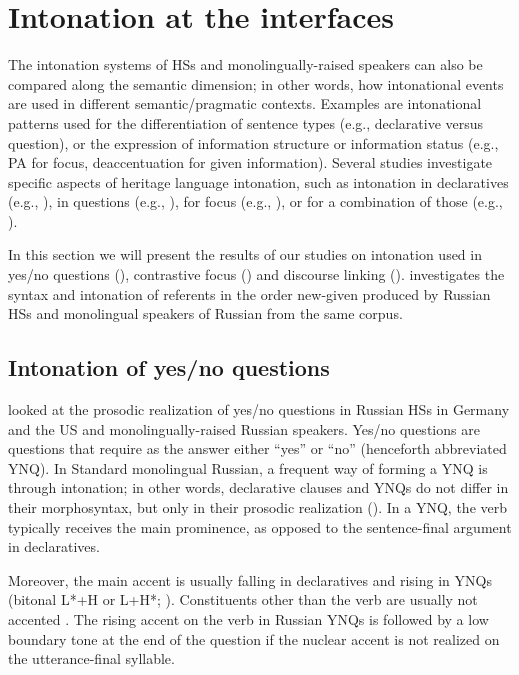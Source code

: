 \documentclass[output=paper,colorlinks,citecolor=brown]{langscibook}
\begin{document}
\section{Intonation at the interfaces} \label{chapter12:section 4}

The intonation systems of HSs and monolingually-raised speakers can also be compared along the semantic dimension; in other words, how intonational events are used in different semantic/pragmatic contexts. Examples are intonational patterns used for the differentiation of sentence types (e.g., declarative versus question), or the expression of information structure or information status (e.g., PA for focus, deaccentuation for given information). Several studies investigate specific aspects of heritage language intonation, such as intonation in declaratives (e.g., \cite{Robles-Puente_2014, Colantoni_Cuza_Mazzaro_2016}), in questions (e.g., \cite{Dehé_2018}), for focus (e.g., \cite{Gries_Miglio_2014, RijswijkDijkstra2017, Kim_2019}), or for a combination of those (e.g., \cite{Rao_2016}).

In this section we will present the results of our studies on intonation used in yes/no questions (), contrastive focus () and discourse linking (). \citet{Zuban} investigates the syntax and intonation of referents in the order new-given produced by Russian HSs and monolingual speakers of Russian from the same corpus.


\subsection{Intonation of yes/no questions} \label{chapter12:section 4.1}

\citet{Zuban_Rathcke_Zerbian_2023} looked at the prosodic realization of yes/no questions in Russian HSs in Germany and the US and monolingually-raised Russian speakers. Yes/no questions are questions that require as the answer either “yes” or “no” (henceforth abbreviated YNQ). In Standard monolingual Russian, a frequent way of forming a YNQ is through intonation; in other words, declarative clauses and YNQs do not differ in their morphosyntax, but only in their prosodic realization (\cite{Bryzgunova_1980, Svetozarova_1998, Rathcke_2006}). In a YNQ, the verb typically receives the main prominence, as opposed to the sentence-final argument in declaratives. 

Moreover, the main accent is usually falling in declaratives and rising in YNQs (bitonal L*+H or L+H*; \cites{Rathcke_2006}[1619]{Meyer_Mleinek_2006}[93]{Makarova_2003}). Constituents other than the verb are usually not accented \citep{Rathcke_2006}. The rising accent on the verb in Russian YNQs is followed by a low boundary tone at the end of the question if the nuclear accent is not realized on the utterance-final syllable.
\end{document}
